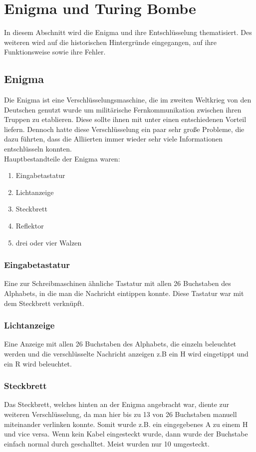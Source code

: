 \section{Enigma und Turing Bombe}
\label{enigma}
In diesem Abschnitt wird die Enigma und ihre Entschlüsselung thematisiert. Des weiteren wird auf die historischen Hintergründe eingegangen, auf ihre Funktionsweise sowie ihre Fehler.

\subsection{Enigma}
Die Enigma ist eine Verschlüsselungsmaschine, die im zweiten Weltkrieg von den Deutschen genutzt wurde um militärische Fernkommunikation zwischen ihren Truppen zu etablieren. Diese sollte ihnen mit unter einen entschiedenen Vorteil liefern. Dennoch hatte diese Verschlüsselung ein paar sehr große Probleme, die dazu führten, dass die Alliierten immer wieder sehr viele Informationen entschlüsseln konnten.\\
Hauptbestandteile der Enigma waren:
\begin{enumerate}
\item Eingabetastatur
\item Lichtanzeige
\item Steckbrett
\item Reflektor
\item drei oder vier Walzen
\end{enumerate}

\subsubsection{Eingabetastatur}
Eine zur Schreibmaschinen ähnliche Tastatur mit allen 26 Buchstaben des Alphabets, in die man die Nachricht eintippen konnte. Diese Tastatur war mit dem Steckbrett verknüpft.

\subsubsection{Lichtanzeige}
Eine Anzeige mit allen 26 Buchstaben des Alphabets, die einzeln beleuchtet werden und die verschlüsselte Nachricht anzeigen z.B ein H wird eingetippt und ein R wird beleuchtet.

\subsubsection{Steckbrett}
\label{sec:steck}
Das Steckbrett, welches hinten an der Enigma angebracht war, diente zur weiteren Verschlüsselung, da man hier bis zu 13 von 26 Buchstaben manuell miteinander verlinken konnte. Somit wurde z.B. ein eingegebenes A zu einem H und vice versa. Wenn kein Kabel eingesteckt wurde, dann wurde der Buchstabe einfach normal durch geschalltet. Meist wurden nur 10 umgesteckt.


